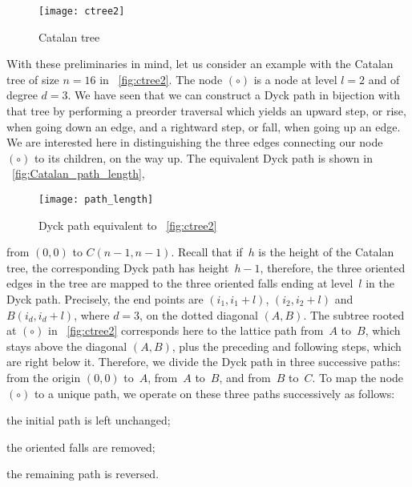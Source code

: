 \begin{wrapfigure}[9]{r}[0pt]{0pt}
\centering
\texttt{[image: ctree2]}
\caption{Catalan tree \label{fig:ctree2}}
\end{wrapfigure}
With these preliminaries in mind, let us consider an example with the
Catalan tree of size \(n=16\) in \fig~\vref{fig:ctree2}. The node
\((\circ)\) is a node at level \(l=2\) and of degree \(d=3\). We have
seen that we can construct a Dyck path in bijection with that tree by
performing a preorder traversal which yields an upward step, or rise,
when going down an edge, and a rightward step, or fall, when going up
an edge. We are interested here in distinguishing the three edges
connecting our node \((\circ)\) to its children, on the way up.  The
equivalent Dyck path is shown in
\fig~\vref{fig:Catalan_path_length},
\begin{figure}[t]
\centering
\texttt{[image: path\_length]}
\caption{Dyck path equivalent to \fig~\vref{fig:ctree2} \label{fig:Catalan_path_length}}
\end{figure}
from \((0,0)\) to \(C(n-1,n-1)\). Recall that if~\(h\) is the height
of the Catalan tree, the corresponding Dyck path has height~\(h-1\),
therefore, the three oriented edges in the tree are mapped to the
three oriented falls ending at level~\(l\) in the Dyck
path. Precisely, the end points are \((i_1,i_1+l)\), \((i_2,i_2+l)\)
and \(B(i_d,i_d+l)\), where \(d=3\), on the dotted diagonal
\((A,B)\). The subtree rooted at \((\circ)\) in \fig~\vref{fig:ctree2}
corresponds here to the lattice path from~\(A\) to~\(B\), which stays
above the diagonal \((A,B)\), plus the preceding and following steps,
which are right below it. Therefore, we divide the Dyck path in three
successive paths: from the origin \((0,0)\) to~\(A\), from~\(A\)
to~\(B\), and from~\(B\) to~\(C\). To map the node~\((\circ)\) to a
unique path, we operate on these three paths successively as follows:
\begin{enumerate*}

  \item the initial path is left unchanged;

  \item the oriented falls are removed;

  \item the remaining path is reversed.

\end{enumerate*}
